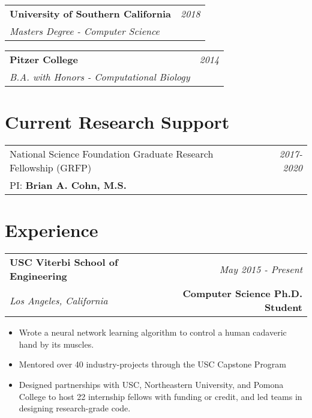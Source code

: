 \documentclass[10pt,a4paper]{article}
\begin{document}
  \vspace*{1mm}\noindent\begin{tabularx}{17cm}{X r}
    \textbf{University of Southern California} & \textit{2018} \\ %
    \textit{Masters Degree - Computer Science}
  \end{tabularx} 

  \vspace*{1mm}\noindent\begin{tabularx}{17cm}{X r}
    \textbf{Pitzer College} & \textit{2014} \\
    \textit{B.A. with Honors - Computational Biology}
  \end{tabularx}

  \vspace*{2mm}\section*{Current Research Support}

  \vspace*{1mm}\noindent\begin{tabularx}{17cm}{X r}
    National Science Foundation Graduate Research Fellowship (GRFP) & \textit{2017-2020} \\
    PI: \textbf{Brian A. Cohn, M.S.} \\
\end{tabularx}



    \vspace*{6mm}\section*{Experience}
  \noindent\begin{tabularx}{17cm}{X r}
    \textbf{USC Viterbi School of Engineering} & \textit{May 2015 - Present} \\
    \textit{Los Angeles, California} & \textbf{Computer Science Ph.D. Student} \\
  \end{tabularx}

  \vspace*{1mm}\noindent\begin{minipage}{17cm}
    \begin{itemize}[leftmargin=6mm,topsep=0mm,itemsep=-1mm]
      \item Wrote a neural network learning algorithm to control a human cadaveric hand by its muscles. 
      \item Mentored over 40 industry-projects through the USC Capstone Program
      \item Designed partnerships with USC, Northeastern University, and Pomona College to host 22 internship fellows with funding or credit, and led teams in designing research-grade code.
    \end{itemize}
  \end{minipage}
\end{document}
